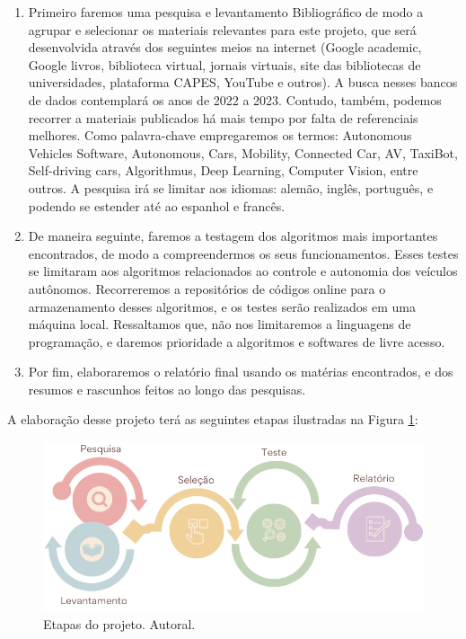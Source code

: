 \documentclass{article}
\begin{document}
\begin{enumerate}
\item Primeiro faremos uma pesquisa e levantamento Bibliográfico de modo a agrupar e selecionar os materiais relevantes para este projeto, que será desenvolvida através dos seguintes meios na internet (Google academic, Google livros, biblioteca virtual, jornais virtuais, site das bibliotecas de universidades, plataforma CAPES, YouTube e outros). A busca nesses bancos de dados contemplará os anos de 2022 a 2023. Contudo, também, podemos recorrer a materiais publicados há mais tempo por falta de referenciais melhores. Como palavra-chave empregaremos os termos: Autonomous Vehicles Software, Autonomous, Cars, Mobility, Connected Car, AV, TaxiBot, Self-driving cars, Algorithmus, Deep Learning, Computer Vision, entre outros.  A pesquisa irá se limitar aos idiomas: alemão, inglês, português, e podendo se estender até ao espanhol e francês.

\item De maneira seguinte, faremos a testagem dos algoritmos mais importantes encontrados, de modo a compreendermos os seus funcionamentos. Esses testes se limitaram aos algoritmos relacionados ao controle e autonomia dos veículos autônomos. Recorreremos a repositórios de códigos online para o armazenamento desses algoritmos, e os testes serão realizados em uma máquina local. Ressaltamos que, não nos limitaremos a linguagens de programação, e daremos prioridade a algoritmos e softwares de livre acesso.
\item Por fim, elaboraremos o relatório final usando os matérias encontrados, e dos resumos e rascunhos feitos ao longo das pesquisas.
\end{enumerate}

A elaboração desse projeto terá as seguintes etapas ilustradas na Figura \ref{img_bibli}:

\begin{figure}[H]
\centering
\includegraphics[width=14cm]{Figures/methodology.png}
\caption{Etapas do projeto. Autoral.}
\label{img_bibli}
\end{figure}
\end{document}

